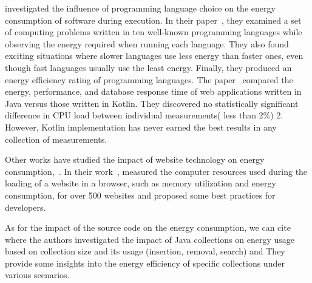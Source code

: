 \citeauthor{couto2017towards} investigated the influence of programming language choice on the energy consumption of software during execution. In their paper~\cite{couto2017towards}, they examined a set of computing problems written in ten well-known programming languages while observing the energy required when running each language. They also found exciting situations where slower languages use less energy than faster ones, even though fast languages usually use the least energy.
Finally, they produced an energy efficiency rating of programming languages.
The paper~\cite{bujnowski2020java} compared the energy, performance, and database response time of web applications written in Java versus those written in Kotlin. They discovered no statistically significant difference in CPU load between individual measurements( less than 2\%) 2. However, Kotlin implementation has never earned the best results in any collection of measurements.

Other works have studied the impact of website technology on energy consumption,~\cite{philippot_characterization_2014,manotas_investigating_2013}. In their work~\cite{philippot_characterization_2014},\citeauthor{philippot_characterization_2014} measured the computer resources used during the loading of a website in a browser, such as memory utilization and energy consumption, for over 500 websites and proposed some best practices for developers.


As for the impact of the source code on the energy consumption, we can cite~\cite{pinto_comprehensive_2016,fernandes_assisting_2017} where the authors investigated the impact of Java collections on energy usage based on collection size and its usage (insertion, removal, search) and They provide some insights into the energy efficiency of specific collections under various scenarios.

